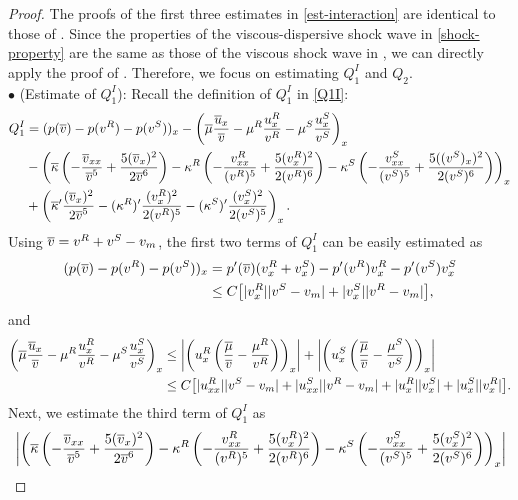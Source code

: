 \documentclass[11pt,reqno]{amsart}
\begin{document}
\begin{proof} 
	The proofs of the first three estimates in \eqref{est-interaction} are identical to those of \cite[Lemma 4.2]{KVW23}. Since the properties of the viscous-dispersive shock wave in \eqref{shock-property} are the same as those of the viscous shock wave in \cite[Lemma 2.2]{KVW23}, we can directly apply the proof of \cite{KVW23}. Therefore, we focus on estimating $Q_1^I$ and $Q_2$.\\
	
	\noindent $\bullet$ (Estimate of $Q_1^I$): Recall the definition of $Q_1^I$ in \eqref{Q1I}:
\begin{align*}
    Q_1^I&=(p(\overline{v})-p(v^R)-p(v^S))_x-\left(\overline{\mu}\frac{\overline{u}_x}{\overline{v}}-\mu^R\frac{u^R_x}{v^R}-\mu^S\frac{u^S_x}{v^S}\right)_x\\
    &-\left( \overline{\kappa} \left(-\frac{\overline{v}_{xx}}{\overline{v}^5} + \frac{5(\overline{v}_x)^2}{2\overline{v}^6} \right)-\kappa^R \left(-\frac{v^R_{xx}}{(v^R)^5} + \frac{5(v^R_x)^2}{2(v^R)^6} \right)-\kappa^S \left(-\frac{v^S_{xx}}{(v^S)^5} + \frac{5((v^S)_x)^2}{2(v^S)^6} \right)\right)_x\\
    &+\left(  \overline{\kappa}' \frac{(\overline{v}_x)^2}{2\overline{v}^5} -(\kappa^R)' \frac{(v^R_x)^2}{2(v^R)^5}-(\kappa^S)' \frac{(v^S_x)^2}{2(v^S)^5}\right)_x.
\end{align*}
Using $\overline{v}=v^R+v^S-v_m$, the first two terms of $Q_1^I$ can be easily estimated as
    \begin{align*}
        (p(\overline{v})-p(v^R)-p(v^S))_x & =p'(\overline{v})(v^R_x+v^S_x)-p'(v^R)v^R_x-p'(v^S)v^S_x\\
        &\le C \big[ |v^R_x| |v^S-v_m| + |v^S_x| |v^R-v_m|\big],
    \end{align*}
and
    \begin{align*}
        \left(\overline{\mu}\frac{\overline{u}_x}{\overline{v}}-\mu^R \frac{u^R_x}{v^R}-\mu^S \frac{u^S_x}{v^S}\right)_x 
        &\le \left| \left( u^R_x \left( \frac{\overline{\mu}}{\overline{v}}-\frac{\mu^R}{v^R} \right) \right)_x \right| +\left|\left( u^S_x \left( \frac{\overline{\mu}}{\overline{v}}- \frac{\mu^S}{v^S}\right) \right)_x \right|\\
        &\le C \big[ |u^R_{xx}| |v^S-v_m| + |u^S_{xx}| |v^R-v_m| + |u^R_x||v^S_x| +|u^S_x| |v^R_x|\big].
    \end{align*}
Next, we estimate the third term of $Q^I_1$ as
    \begin{align*}
        &\left| \left( \ok \left(-\frac{\ov_{xx}}{\ov^5} + \frac{5(\ov_x)^2}{2\ov^6} \right)-\kr \left(-\frac{\vr_{xx}}{(\vr)^5} + \frac{5(\vr_x)^2}{2(\vr)^6} \right)-\ks \left(-\frac{\vs_{xx}}{(\vs)^5} + \frac{5(\vs_x)^2}{2(\vs)^6} \right) \right)_x \right| \\

\end{align*}
\end{proof}
\end{document}
